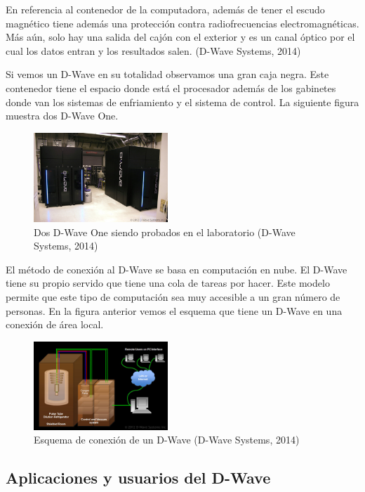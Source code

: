 \documentclass[11pt,a4paper]{article}
\begin{document}
En referencia al contenedor de la computadora, además de tener el escudo magnético tiene además una protección contra radiofrecuencias electromagnéticas. Más aún, solo hay una salida del cajón con el exterior y es un canal óptico por el cual los datos entran y los resultados salen.  (D-Wave Systems, 2014)

Si vemos un D-Wave en su totalidad observamos una gran caja negra. Este contenedor tiene el espacio donde está el procesador además de los gabinetes donde van los sistemas de enfriamiento y el sistema de control. La siguiente figura muestra dos D-Wave One.
\clearpage
\begin{figure}
\centering
\includegraphics[width=0.45\textwidth]{dwave}
\caption{Dos D-Wave One siendo probados en el laboratorio (D-Wave Systems, 2014)}
\end{figure}

El método de conexión al D-Wave se basa en computación en nube. El D-Wave tiene su propio servido que tiene una cola de tareas por hacer. Este modelo permite que este tipo de computación sea muy accesible a un gran número de personas. En la figura anterior vemos el esquema que tiene un D-Wave en una conexión de área local.

\begin{figure}
\centering
\includegraphics[width=0.45\textwidth]{esquema}
\caption{Esquema de conexión de un D-Wave (D-Wave Systems, 2014)}
\end{figure}

\clearpage
\subsection*{Aplicaciones y usuarios del D-Wave}
\end{document}
